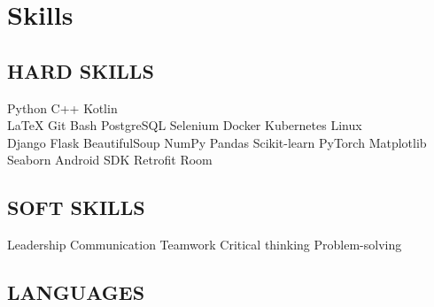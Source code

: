 \documentclass[]{resume}
\begin{document}
\begin{minipage}[t]{0.33\textwidth}

\section{Skills}
\subsection{HARD SKILLS}
Python \textbullet{} C++ \textbullet{} Kotlin \\
\LaTeX \textbullet{} Git \textbullet{} Bash \textbullet{} PostgreSQL \textbullet{} Selenium \textbullet{} Docker \textbullet{} Kubernetes \textbullet{} Linux\\
Django \textbullet{} Flask \textbullet{} BeautifulSoup
\textbullet{} NumPy \textbullet{} Pandas \textbullet{} Scikit-learn \textbullet{} PyTorch \textbullet{} Matplotlib \textbullet{} Seaborn \textbullet{} Android SDK \textbullet{} Retrofit \textbullet{} Room\\
\sectionsep

\subsection{SOFT SKILLS}
Leadership \textbullet{} Communication \textbullet{} Teamwork \textbullet{} Critical thinking \textbullet{} Problem-solving
\sectionsep

\subsection{LANGUAGES}
\sectionsep

%
%

\end{minipage} 
\hfill
\end{document}
